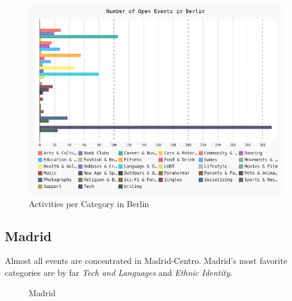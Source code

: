 \begin{figure}[!htp]
	\includegraphics[width=1\linewidth]{../plotting/pngs/categories/Berlin.png}
	\caption{Activities per Category in Berlin}\label{fig:berlinbar}	
\end{figure}


\subsection*{Madrid}

Almost all events are concentrated in Madrid-Centro. Madrid's most favorite categories are by far \emph{Tech and Languages} and \emph{Ethnic Identity}. 

\begin{figure}[!htp]
	\hfill
	\caption{Madrid}
\end{figure}

